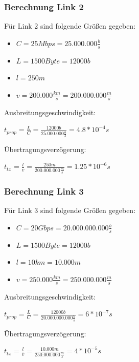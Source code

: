 \documentclass{kdiartcl}
\begin{document}
\subsubsection{Berechnung Link 2}
    Für Link 2 sind folgende Größen gegeben: \\
    \begin{itemize}
        \item $C = 25 Mbps = 25.000.000 \frac{b}{s}$
        \item $L = 1500 Byte = 12000 b$
        \item $l = 250m$
        \item $v = 200.000 \frac{km}{s} = 200.000.000 \frac{m}{s}$
    \end{itemize}
    Ausbreitungsgeschwindigkeit: \\
    \begin{center}
        $t_{prop} = \frac{L}{C} = \frac{12000 b}{25.000.000 \frac{b}{s}} = 4.8 * 10^{-4}s$
    \end{center}
    Übertragungsverzögerung: \\
    \begin{center}
        $t_{tx} = \frac{l}{v} = \frac{250m}{200.000.000\frac{m}{s}} = 1.25 * 10^{-6}s$
    \end{center}
\subsubsection{Berechnung Link 3}
    Für Link 3 sind folgende Größen gegeben: \\
    \begin{itemize}
        \item $C = 20 Gbps = 20.000.000.000 \frac{b}{s}$
        \item $L = 1500 Byte = 12000 b$
        \item $l = 10km = 10.000m$
        \item $v = 250.000 \frac{km}{s} = 250.000.000 \frac{m}{s}$
    \end{itemize}
    Ausbreitungsgeschwindigkeit: \\
    \begin{center}
        $t_{prop} = \frac{L}{C} = \frac{12000 b}{20.000.000.000 \frac{b}{s}} = 6 * 10^{-7}s$
    \end{center}
    Übertragungsverzögerung: \\
    \begin{center}
        $t_{tx} = \frac{l}{v} = \frac{10.000m}{250.000.000\frac{m}{s}} = 4 * 10^{-5}s$
    \end{center}
\end{document}
